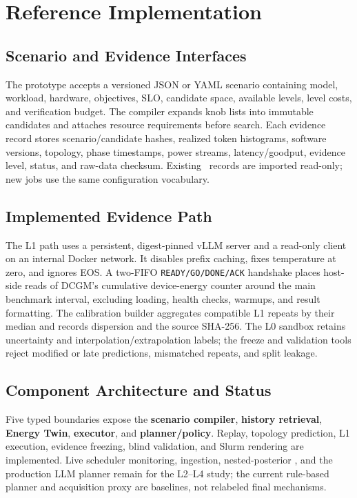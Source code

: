 \section{Reference Implementation}

\subsection{Scenario and Evidence Interfaces}

The prototype accepts a versioned JSON or YAML scenario containing model,
workload, hardware, objectives, SLO, candidate space, available levels, level
costs, and verification budget.  The compiler expands knob lists into immutable
candidates and attaches resource requirements before search.  Each evidence
record stores scenario/candidate hashes, realized token histograms, software
versions, topology, phase timestamps, power streams, latency/goodput, evidence
level, status, and raw-data checksum.  Existing \bench{}\ records are imported
read-only; new jobs use the same configuration vocabulary.

\subsection{Implemented Evidence Path}

The L1 path uses a persistent, digest-pinned vLLM server and a read-only client
on an internal Docker network.  It disables prefix caching, fixes temperature
at zero, and ignores EOS.  A two-FIFO \texttt{READY/GO/DONE/ACK} handshake
places host-side reads of DCGM's cumulative device-energy counter around the
main benchmark interval, excluding loading, health checks, warmups, and result
formatting.  The calibration builder aggregates compatible L1 repeats by their
median and records dispersion and the source SHA-256.  The L0 sandbox retains
uncertainty and interpolation/extrapolation labels; the freeze and validation
tools reject modified or late predictions, mismatched repeats, and split
leakage.

\subsection{Component Architecture and Status}

Five typed boundaries expose the \textbf{scenario compiler}, \textbf{history
retrieval}, \textbf{Energy Twin}, \textbf{executor}, and
\textbf{planner/policy}.  Replay, topology prediction, L1 execution, evidence
freezing, blind validation, and Slurm rendering are implemented.  Live
scheduler monitoring, \bench{} ingestion, nested-posterior \ipig{}, and the
production LLM planner remain for the L2--L4 study; the current rule-based
planner and acquisition proxy are baselines, not relabeled final mechanisms.

